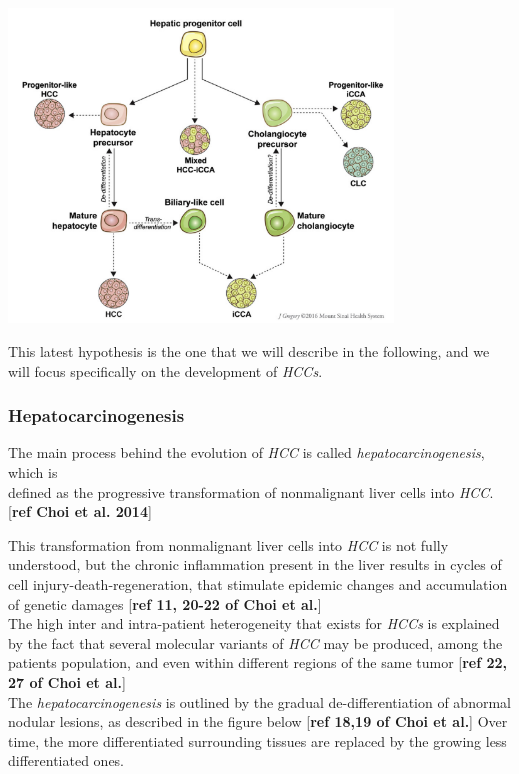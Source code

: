 \documentclass[]{article}
\begin{document}
\includegraphics[width=4.02101in,height=3.28628in]{./images/media/image6.png}

This latest hypothesis is the one that we will describe in the
following, and we will focus specifically on the development of
\emph{HCCs}.

\subsubsection{Hepatocarcinogenesis}\label{hepatocarcinogenesis}

The main process behind the evolution of \emph{HCC} is called
\emph{hepatocarcinogenesis}, which is\\
defined as the progressive transformation of nonmalignant liver cells
into \emph{HCC}. {[}\textbf{ref Choi et al. 2014}{]}

This transformation from nonmalignant liver cells into \emph{HCC} is not
fully understood, but the chronic inflammation present in the liver
results in cycles of cell injury-death-regeneration, that stimulate
epidemic changes and accumulation of genetic damages {[}\textbf{ref 11,
20-22 of Choi et al.}{]}\\
The high inter and intra-patient heterogeneity that exists for
\emph{HCCs} is explained by the fact that several molecular variants of
\emph{HCC} may be produced, among the patients population, and even
within different regions of the same tumor {[}\textbf{ref 22, 27 of Choi
et al.}{]}\\
The \emph{hepatocarcinogenesis} is outlined by the gradual
de-differentiation of abnormal nodular lesions, as described in the
figure below {[}\textbf{ref 18,19 of Choi et al.}{]} Over time, the more
differentiated surrounding tissues are replaced by the growing less
differentiated ones.
\end{document}
